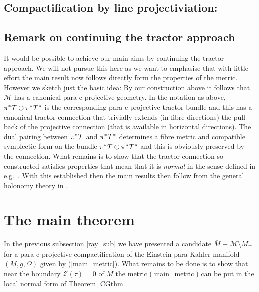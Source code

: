 \subsection{Compactification by line projectiviation:}
 




\subsection{Remark on continuing the tractor approach}
It would be possible to achieve our main aims by continuing the
tractor approach.  We will not pursue this here as we want to
emphasise that with little effort the main result now follows directly
form the properties of the metric.  However we sketch just the basic idea: By
our construction above it follows that $\mathcal{M}$ has a canonical
para-c-projective geometry. In the notation as above, $\pi^*{\mathcal{T}}\oplus
\pi^*{\mathcal{T}^*}$ is the corresponding para-c-projective tractor bundle
and this has a canonical tractor connection that trivially
extends (in fibre directions) the pull back of the projective
connection (that is available in horizontal directions). The
dual pairing between $\pi^*{\mathcal{T}}$ and $\pi^*{\mathcal{T}^*}$ determines a
fibre metric and compatible symplectic form on the bundle
$\pi^*{\mathcal{T}}\oplus \pi^*{\mathcal{T}^*}$ and this is obviously preserved by the
connection. What remains is to show that the tractor connection so
constructed satisfies properties that mean that it is {\em normal} in
the sense defined in e.g.\ \cite{CS-book}. With this established then
the main results then follow from the general holonomy theory in
\cite{CGH-duke}.



\section{The main theorem}
In the previous subsection \ref{ray_sub} we have presented a candidate 
$\overline{M}\equiv\mathcal{M}\setminus M_{\mp}$ for a para-c-projective
compactification of the Einstein para-Kahler manifold $(M, g, \Omega)$ given 
by (\ref{main_metric}). What remains to be done is to show that near
the boundary ${\mathcal{Z}}(\tau)=0$ of $\overline{M}$ the metric 
(\ref{main_metric}) can be put in the local normal form of Theorem 
\ref{CGthm}.



